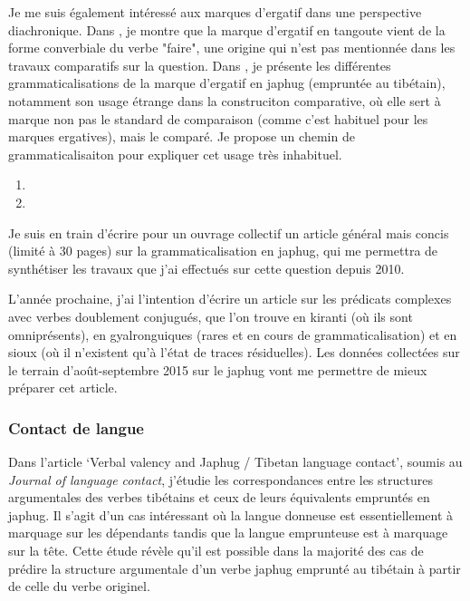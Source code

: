 \documentclass[oldfontcommands,oneside,a4paper,11pt]{article}
\begin{document}
Je me suis également intéressé aux marques d'ergatif dans une perspective diachronique. Dans \citet{jacques14ergative}, je montre que la marque d'ergatif en tangoute vient de la forme converbiale du verbe "faire", une origine qui n'est pas mentionnée dans les travaux comparatifs sur la question. Dans \citet{jacques15comparative}, je présente les différentes grammaticalisations de la marque d'ergatif en japhug (empruntée au tibétain), notamment son usage étrange dans la construciton comparative, où elle sert à marque non pas le standard de comparaison (comme c'est habituel pour les marques ergatives), mais le comparé. Je propose un chemin de grammaticalisaiton pour expliquer cet usage très inhabituel.

\begin{enumerate}
 \item  {}
 \item {}
\end{enumerate}

Je suis en train d'écrire pour un ouvrage collectif un article général mais concis (limité à 30 pages) sur la grammaticalisation en japhug, qui me permettra de synthétiser les travaux que j'ai effectués sur cette question depuis 2010.

L'année prochaine, j'ai l'intention d'écrire un article sur les prédicats complexes avec verbes doublement conjugués, que l'on trouve en kiranti (où ils sont omniprésents), en gyalronguiques (rares et en cours de grammaticalisation) et en sioux (où il n'existent qu'à l'état de traces résiduelles). Les données collectées sur le terrain d'août-septembre 2015 sur le japhug vont me permettre de mieux préparer cet article.

\subsubsection{Contact de langue}
Dans l'article `Verbal valency and Japhug / Tibetan language contact', soumis au \textit{Journal of language contact}, j'étudie les correspondances entre les structures argumentales des verbes tibétains et ceux de leurs équivalents empruntés en japhug. Il s'agit d'un cas intéressant où la langue donneuse est essentiellement à marquage sur les dépendants tandis que la langue emprunteuse est à marquage sur la tête. Cette étude révèle qu'il est possible dans la majorité des cas de prédire la structure argumentale d'un verbe japhug emprunté au tibétain à partir de celle du verbe originel.
\end{document}
